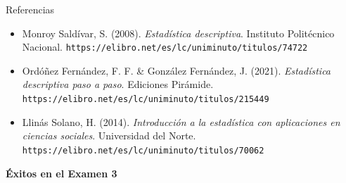 \documentclass[aspectratio=169,10pt]{beamer}
\begin{document}
\begin{frame}{Referencias}
  \footnotesize
  \begin{itemize}
    \item[{[1]}] Monroy Saldívar, S. (2008). \textit{Estadística descriptiva}.
      Instituto Politécnico Nacional.
      \texttt{https://elibro.net/es/lc/uniminuto/titulos/74722}
    \item[{[2]}] Ordóñez Fernández, F. F. \& González Fernández, J. (2021).
      \textit{Estadística descriptiva paso a paso}. Ediciones Pirámide.
      \texttt{https://elibro.net/es/lc/uniminuto/titulos/215449}
    \item[{[3]}] Llinás Solano, H. (2014). \textit{Introducción a la
      estadística con aplicaciones en ciencias sociales}. Universidad del
      Norte. \texttt{https://elibro.net/es/lc/uniminuto/titulos/70062}
  \end{itemize}

  \vspace{0.35cm}
  \begin{center}
    {\Large\color{uniAzul}\textbf{Éxitos en el Examen 3}}
  \end{center}
\end{frame}
\end{document}
